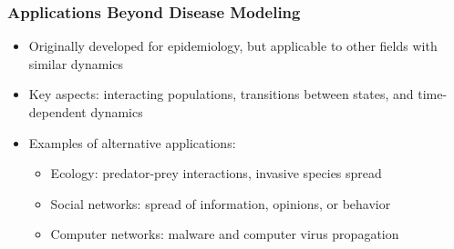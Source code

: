 \begin{frame}
  \frametitle{Applications Beyond Disease Modeling}
  \begin{itemize}
    \item Originally developed for epidemiology, but applicable to other fields with similar dynamics
    \item Key aspects: interacting populations, transitions between states, and time-dependent dynamics
    \item Examples of alternative applications:
      \begin{itemize}
        \item Ecology: predator-prey interactions, invasive species spread
        \item Social networks: spread of information, opinions, or behavior
        \item Computer networks: malware and computer virus propagation
      \end{itemize}
  \end{itemize}
\end{frame}
